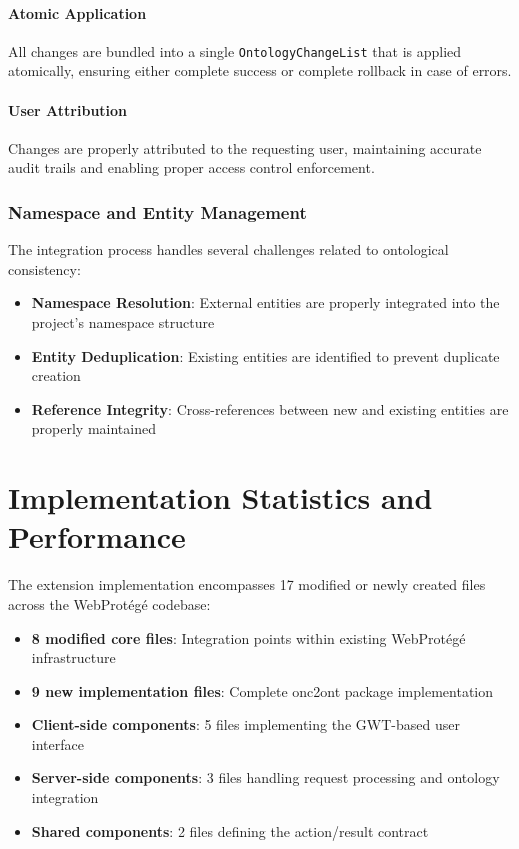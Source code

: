 \paragraph{Atomic Application}
All changes are bundled into a single \texttt{OntologyChangeList} that is applied atomically, ensuring either complete success or complete rollback in case of errors.

\paragraph{User Attribution}
Changes are properly attributed to the requesting user, maintaining accurate audit trails and enabling proper access control enforcement.

\subsubsection{Namespace and Entity Management}

The integration process handles several challenges related to ontological consistency:

\begin{itemize}
\item \textbf{Namespace Resolution}: External entities are properly integrated into the project's namespace structure
\item \textbf{Entity Deduplication}: Existing entities are identified to prevent duplicate creation
\item \textbf{Reference Integrity}: Cross-references between new and existing entities are properly maintained
\end{itemize}

\section{Implementation Statistics and Performance}

The extension implementation encompasses 17 modified or newly created files across the WebProtégé codebase:

\begin{itemize}
\item \textbf{8 modified core files}: Integration points within existing WebProtégé infrastructure
\item \textbf{9 new implementation files}: Complete onc2ont package implementation
\item \textbf{Client-side components}: 5 files implementing the GWT-based user interface
\item \textbf{Server-side components}: 3 files handling request processing and ontology integration
\item \textbf{Shared components}: 2 files defining the action/result contract
\end{itemize}

